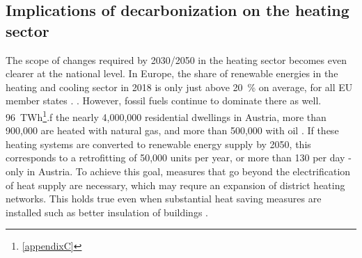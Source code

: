 \subsection{Implications of decarbonization on the heating sector}
The scope of changes required by 2030/2050 in the heating sector becomes even clearer at the national level. In Europe, the share of renewable energies in the heating and cooling sector in 2018 is only just above \SI{20}{\%} on average, for all EU member states \cite{eurostat_reference}. . However, fossil fuels continue to dominate there as well.  \SI{96}{TWh}\footnote{\ref{appendixC} }.f the nearly 4,000,000 residential dwellings in Austria, more than 900,000 are heated with natural gas, and more than 500,000 with oil \cite{statistik_austria}. If these heating systems are converted to renewable energy supply by 2050, this corresponds to a retrofitting of 50,000 units per year, or more than 130 per day - only in Austria. To achieve this goal, measures that go beyond the electrification of heat supply are necessary, which may requre an expansion of district heating networks. This holds true even when substantial heat saving measures are installed such as better insulation of buildings \cite{jalil2018spatially}.\vspace{0.3cm}

